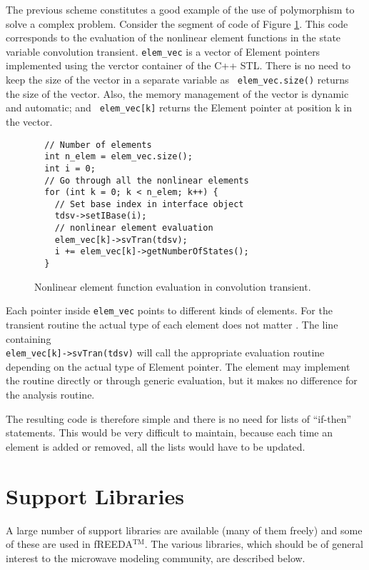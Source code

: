 The previous scheme constitutes a good example of the use of
polymorphism to solve a complex problem.  Consider the segment of code
of Figure \ref{fig:nleval}. This code corresponds to the evaluation of
the nonlinear element functions in the state variable convolution
transient.  {\tt elem\_vec} is a vector of Element pointers
implemented using the verctor container of the C++ STL. There is no
need to keep the size of the vector in a separate variable as {\tt
elem\_vec.size()} returns the size of the vector. Also, the memory
management of the vector is dynamic and automatic; and {\tt
elem\_vec[k]} returns the Element pointer at position k in the vector.

%
\begin{figure}[htpb]
\begin{verbatim}
  // Number of elements
  int n_elem = elem_vec.size();
  int i = 0;
  // Go through all the nonlinear elements
  for (int k = 0; k < n_elem; k++) {
    // Set base index in interface object
    tdsv->setIBase(i);
    // nonlinear element evaluation
    elem_vec[k]->svTran(tdsv);
    i += elem_vec[k]->getNumberOfStates();
  }
\end{verbatim}
\caption{Nonlinear element function evaluation in convolution transient.} 
\label{fig:nleval}
\end{figure}
%

Each pointer inside {\tt elem\_vec} points to different kinds of
elements. For the transient routine the actual type of each element
does not matter . The line containing \\ {\tt elem\_vec[k]->svTran(tdsv)}
will call the appropriate evaluation routine depending on the actual
type of Element pointer. The element may implement the routine
directly or through generic evaluation, but it makes no difference for
the analysis routine.

The resulting code is therefore simple and there is no need for lists
of ``if-then'' statements. This would be very difficult to maintain,
because each time an element is added or removed, all the lists would
have to be updated.

\section{Support Libraries}

A large number of support libraries are available (many of them
freely) and some of these are used in fREEDA$^{\mathrm{TM}}$. The various libraries,
which should be of general interest to the microwave modeling
community, are described below.

